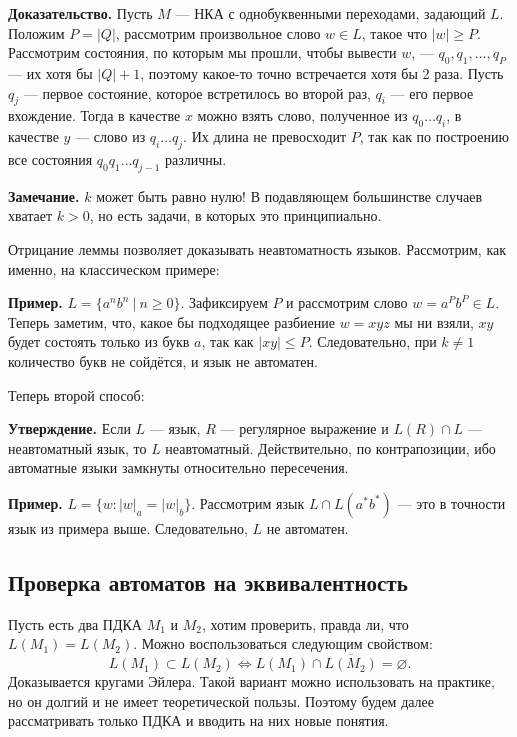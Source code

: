 \textbf{Доказательство.} Пусть $M$ --- НКА с однобуквенными переходами, задающий $L$.
Положим $P = |Q|$, рассмотрим произвольное слово $w \in L$, такое что $|w| \ge P$.
Рассмотрим состояния, по которым мы прошли, чтобы вывести $w$, --- $q_0, q_1, \dots, q_P$ --- их хотя бы $|Q| + 1$, поэтому какое-то точно встречается хотя бы 2 раза.
Пусть $q_j$ --- первое состояние, которое встретилось во второй раз, $q_i$ --- его первое вхождение.
Тогда в качестве $x$ можно взять слово, полученное из $q_0 \dots q_i$, в качестве $y$ --- слово из $q_i \dots q_j$.
Их длина не превосходит $P$, так как по построению все состояния $q_0 q_1 \dots q_{j-1}$ различны.

\QED

\textbf{Замечание.} $k$ может быть равно нулю! В подавляющем большинстве случаев хватает $k > 0$, но есть задачи, в которых это принципиально.

Отрицание леммы позволяет доказывать неавтоматность языков. Рассмотрим, как именно, на классическом примере:

\textbf{Пример.} $L = \{a^nb^n~|~n \ge 0 \}$. Зафиксируем $P$ и рассмотрим слово $w = a^Pb^P \in L$.
Теперь заметим, что, какое бы подходящее разбиение $w = xyz$ мы ни взяли, $xy$ будет состоять только из букв $a$, так как $|xy| \le P$.
Следовательно, при $k \ne 1$ количество букв не сойдётся, и язык не автоматен.

\QED

Теперь второй способ:
 
\textbf{Утверждение.} Если $L$ --- язык, $R$ --- регулярное выражение и $L(R) \cap L$ --- неавтоматный язык, то $L$ неавтоматный.
Действительно, по контрапозиции, ибо автоматные языки замкнуты относительно пересечения.

\textbf{Пример.} $L = \{w: |w|_a = |w|_b\}$.
Рассмотрим язык $L \cap L(a^*b^*)$ --- это в точности язык из примера выше.
Следовательно, $L$ не автоматен.

\QED

\subsection{Проверка автоматов на эквивалентность}
Пусть есть два ПДКА $M_1$ и $M_2$, хотим проверить, правда ли, что $L(M_1) = L(M_2)$.
Можно воспользоваться следующим свойством:
\[
    L(M_1) \subset L(M_2) \iff L(M_1) \cap \overline{L(M_2)} = \varnothing.
\]
Доказывается кругами Эйлера.
Такой вариант можно использовать на практике, но он долгий и не имеет теоретической пользы. Поэтому будем далее рассматривать только ПДКА и вводить на них новые понятия.


